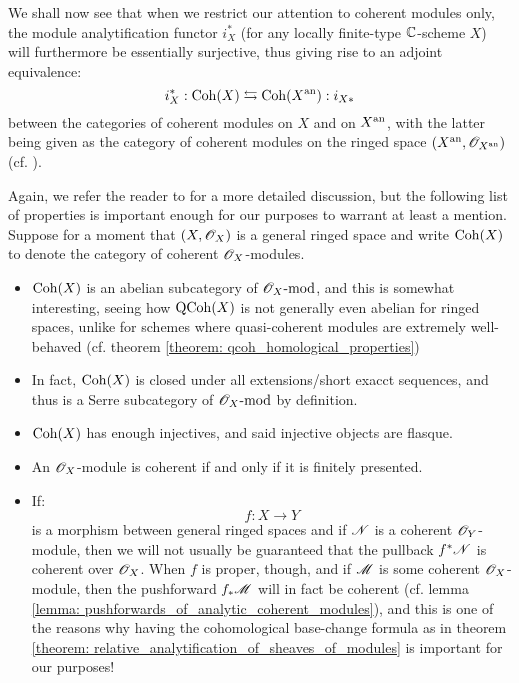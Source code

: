             We shall now see that when we restrict our attention to coherent modules only, the module analytification functor $i_X^*$ (for any locally finite-type $\mathbb{C}$-scheme $X$) will furthermore be essentially surjective, thus giving rise to an adjoint equivalence:
                $$i_X^*: \mathrm{Coh}(X) \leftrightarrows \mathrm{Coh}(X^{\mathrm{an}}): i_{X *}$$
            between the categories of coherent modules on $X$ and on $X^{\mathrm{an}}$, with the latter being given as the category of coherent modules on the ringed space $(X^{\mathrm{an}}, \mathscr{O}_{X^{\mathrm{an}}})$ (cf. \cite[\href{https://stacks.math.columbia.edu/tag/01BU}{Tag 01BU}]{stacks}).
            \begin{remark}
                Again, we refer the reader to \cite[\href{https://stacks.math.columbia.edu/tag/01BU}{Tag 01BU}]{stacks} for a more detailed discussion, but the following list of properties is important enough for our purposes to warrant at least a mention. Suppose for a moment that $(X, \mathscr{O}_X)$ is a general ringed space and write $\mathrm{Coh}(X)$ to denote the category of coherent $\mathscr{O}_X$-modules.
                \begin{itemize}
                    \item $\mathrm{Coh}(X)$ is an abelian subcategory of $\mathscr{O}_X\text{-}\mathrm{mod}$, and this is somewhat interesting, seeing how $\mathrm{QCoh}(X)$ is not generally even abelian for ringed spaces, unlike for schemes where quasi-coherent modules are extremely well-behaved (cf. theorem \ref{theorem: qcoh_homological_properties})
                    \item In fact, $\mathrm{Coh}(X)$ is closed under all extensions/short exacct sequences, and thus is a Serre subcategory of $\mathscr{O}_X\text{-}\mathrm{mod}$ by definition.
                    \item $\mathrm{Coh}(X)$ has enough injectives, and said injective objects are flasque. 
                    \item An $\mathscr{O}_X$-module is coherent if and only if it is finitely presented.
                    \item If:
                        $$f: X \to Y$$
                    is a morphism between general ringed spaces and if $\mathscr{N}$ is a coherent $\mathscr{O}_Y$-module, then we will not usually be guaranteed that the pullback $f^*\mathscr{N}$ is coherent over $\mathscr{O}_X$. When $f$ is proper, though, and if $\mathscr{M}$ is some coherent $\mathscr{O}_X$-module, then the pushforward $f_*\mathscr{M}$ will in fact be coherent (cf. lemma \ref{lemma: pushforwards_of_analytic_coherent_modules}), and this is one of the reasons why having the cohomological base-change formula as in theorem \ref{theorem: relative_analytification_of_sheaves_of_modules} is important for our purposes!


\end{itemize}
\end{remark}
